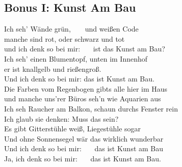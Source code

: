 \subsection{Bonus I: Kunst Am Bau}

Ich seh' Wände grün,\ \ \ \ und weißen Code \\
manche sind rot, oder schwarz und tot \\
und ich denk so bei mir: \ \ \ ist das Kunst am Bau? \\

Ich seh' einen Blumentopf, unten im Innenhof \\
er ist knallgelb und rießengroß. \\
Und ich denk so bei mir: das ist Kunst am Bau. \\

Die Farben vom Regenbogen gibts alle hier im Haus \\
und manche uns'rer Büros seh'n wie Aquarien aus \\
Ich seh Raucher am Balkon, schaun durchs Fenster rein \\
Ich glaub sie denken: \glqq {}Muss das sein?\grqq \\

Es gibt Gitterstühle weiß, Liegestühle sogar \\
Und ohne Sonnensegel wär das wirklich wunderbar \\
Und ich denk so bei mir: \ \ \ das ist Kunst am Bau \\
Ja, ich denk so bei mir: \ \ \ das ist Kunst am Bau. \\

\pagebreak
